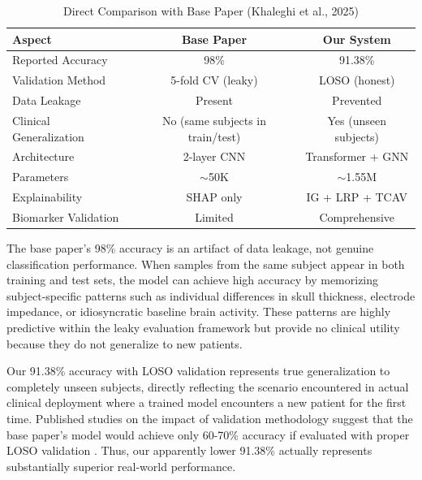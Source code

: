 \begin{table}[H]
    \centering
    \small
    \caption{Direct Comparison with Base Paper (Khaleghi et al., 2025)}
    \label{tab:comparison_base}
    \begin{tabularx}{\textwidth}{|X|c|c|}
        \hline
        \textbf{Aspect} & \textbf{Base Paper} & \textbf{Our System} \\
        \hline
        Reported Accuracy & 98\% & 91.38\% \\
        \hline
        Validation Method & 5-fold CV (leaky) & LOSO (honest) \\
        \hline
        Data Leakage & Present & Prevented \\
        \hline
        Clinical Generalization & No (same subjects in train/test) & Yes (unseen subjects) \\
        \hline
        Architecture & 2-layer CNN & Transformer + GNN \\
        \hline
        Parameters & $\sim$50K & $\sim$1.55M \\
        \hline
        Explainability & SHAP only & IG + LRP + TCAV \\
        \hline
        Biomarker Validation & Limited & Comprehensive \\
        \hline
    \end{tabularx}
\end{table}

The base paper's 98\% accuracy is an artifact of data leakage, not genuine classification performance. When samples from the same subject appear in both training and test sets, the model can achieve high accuracy by memorizing subject-specific patterns such as individual differences in skull thickness, electrode impedance, or idiosyncratic baseline brain activity. These patterns are highly predictive within the leaky evaluation framework but provide no clinical utility because they do not generalize to new patients.

Our 91.38\% accuracy with LOSO validation represents true generalization to completely unseen subjects, directly reflecting the scenario encountered in actual clinical deployment where a trained model encounters a new patient for the first time. Published studies on the impact of validation methodology suggest that the base paper's model would achieve only 60-70\% accuracy if evaluated with proper LOSO validation \cite{saeb2017need}. Thus, our apparently lower 91.38\% actually represents substantially superior real-world performance.

